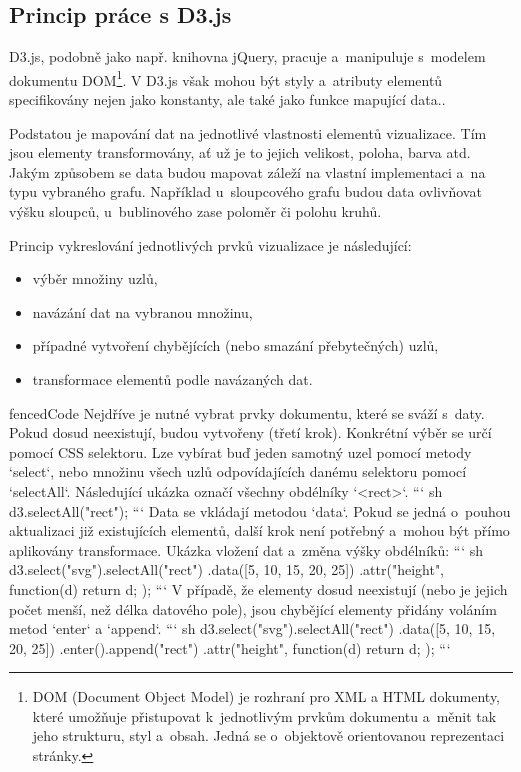 \documentclass[
  digital, %
  oneside, %
  table,   %
  nolof,     %
  nolot,     %
]{fithesis3}
\begin{document}
\subsection{Princip práce s D3.js}
D3.js, podobně jako např. knihovna jQuery, pracuje a~manipuluje s~modelem dokumentu DOM\footnote{DOM (Document Object Model) je rozhraní pro XML a HTML dokumenty, které umožňuje přistupovat k~jednotlivým prvkům dokumentu a~měnit tak jeho strukturu, styl a~obsah. Jedná se o~objektově orientovanou reprezentaci stránky.}. V D3.js však mohou být styly a~atributy elementů specifikovány nejen jako konstanty, ale také jako funkce mapující data.\cite{d3jsorg}.\par
Podstatou je mapování dat na jednotlivé vlastnosti elementů vizualizace. Tím jsou elementy transformovány, ať už je to jejich velikost, poloha, barva atd. Jakým způsobem se data budou mapovat záleží na vlastní implementaci a~na typu vybraného grafu. Například u~sloupcového grafu budou data ovlivňovat výšku sloupců, u~bublinového zase poloměr či polohu kruhů. \cite{interactiveVisualizationBook}\par
Princip vykreslování jednotlivých prvků vizualizace je následující:
\begin{itemize}
  \item výběr množiny uzlů,
  \item navázání dat na vybranou množinu,
  \item případné vytvoření chybějících (nebo smazání přebytečných) uzlů,
  \item transformace elementů podle navázaných dat.
\end{itemize}
\begin{markdown*}{
  fencedCode
}
Nejdříve je nutné vybrat prvky dokumentu, které se sváží s~daty. Pokud dosud neexistují, budou vytvořeny (třetí krok). Konkrétní výběr se určí pomocí CSS selektoru.
Lze vybírat buď jeden samotný uzel pomocí metody `select`, nebo množinu všech uzlů odpovídajících danému selektoru pomocí `selectAll`. Následující ukázka označí všechny obdélníky `<rect>`.
``` sh
	d3.selectAll("rect"); 
```
Data se vkládají metodou `data`. Pokud se jedná o~pouhou aktualizaci již existujících elementů, další krok není potřebný a~mohou být přímo aplikovány transformace. Ukázka vložení dat a~změna výšky obdélníků:
``` sh
	d3.select("svg").selectAll("rect")
	  .data([5, 10, 15, 20, 25])
	  .attr("height", function(d) { return d; });
```
V případě, že elementy dosud neexistují (nebo je jejich počet menší, než délka datového pole), jsou chybějící elementy přidány voláním metod `enter` a `append`.
``` sh
	d3.select("svg").selectAll("rect")
	  .data([5, 10, 15, 20, 25])
	  .enter().append("rect")
	  .attr("height", function(d) { return d; });
```
\end{markdown*}
\end{document}
